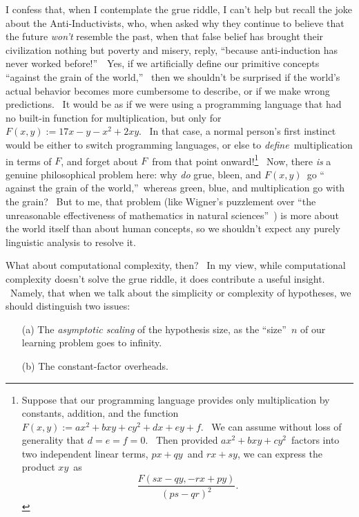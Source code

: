 \documentclass[11pt,onecolumn]{article}%
\begin{document}
I confess that, when I contemplate the grue riddle, I can't help but recall
the joke about the Anti-Inductivists, who, when asked why they continue to
believe that the future \textit{won't} resemble the past, when that false
belief has brought their civilization nothing but poverty and misery, reply,
\textquotedblleft because anti-induction has never worked
before!\textquotedblright\ \ Yes, if we artificially define our primitive
concepts \textquotedblleft against the grain of the world,\textquotedblright%
\ then we shouldn't be surprised if the world's actual behavior becomes more
cumbersome to describe, or if we make wrong predictions. \ It would be as if
we were using a programming language that had no built-in function for
multiplication, but only for $F\left(  x,y\right)  :=17x-y-x^{2}+2xy$. \ In
that case, a normal person's first instinct would be either to switch
programming languages, or else to \textit{define}\ multiplication in terms of
$F$, and forget about $F$\ from that point onward!\footnote{Suppose that our
programming language provides only multiplication by constants, addition, and
the function $F\left(  x,y\right)  :=ax^{2}+bxy+cy^{2}+dx+ey+f$. \ We can
assume without loss of generality that $d=e=f=0$. \ Then provided
$ax^{2}+bxy+cy^{2}$\ factors into two independent linear terms, $px+qy$\ and
$rx+sy$, we can express the product $xy$\ as%
\[
\frac{F\left(  sx-qy,-rx+py\right)  }{\left(  ps-qr\right)  ^{2}}.
\]
} \ Now, there \textit{is} a genuine philosophical problem here: why
\textit{do} grue, bleen, and $F\left(  x,y\right)  $\ go \textquotedblleft
against the grain of the world,\textquotedblright\ whereas green, blue, and
multiplication go with the grain? \ But to me, that problem (like Wigner's
puzzlement over \textquotedblleft the unreasonable effectiveness of
mathematics in natural sciences\textquotedblright\ \cite{wigner}) is more
about the world itself than about human concepts, so we shouldn't expect any
purely linguistic analysis to resolve it.

What about computational complexity, then? \ In my view, while computational
complexity doesn't solve the grue riddle, it does contribute a useful insight.
\ Namely, that when we talk about the simplicity or complexity of hypotheses,
we should distinguish two issues:

\begin{enumerate}
\item[(a)] The \textit{asymptotic scaling} of the hypothesis size, as the
\textquotedblleft size\textquotedblright\ $n$ of our learning problem goes to infinity.

\item[(b)] The constant-factor overheads.
\end{enumerate}
\end{document}
